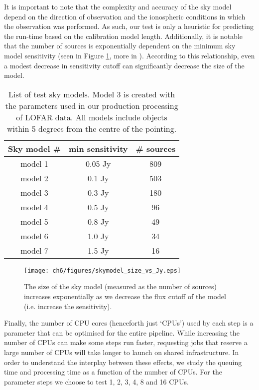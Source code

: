 It is important to note that the complexity and accuracy of the sky model depend on the direction of observation and the ionospheric conditions in which the observation was performed. As such, our test is only a heuristic for predicting the run-time based on the calibration model length. Additionally, it is notable that the number of sources is exponentially dependent on the minimum sky model sensitivity (seen in Figure \ref{fig:ch6_skymodel_size}, more in \citealt{tgssadr,Wendy_bootes}). According to this relationship, even a modest decrease in sensitivity cutoff can significantly decrease the size of the model.

\begin{table}[!ht]
\centering
\begin{tabular}{||c| c | c||} 
 \hline
 Sky model \# & min sensitivity & \# sources  \\ [0.5ex] 
 \hline
 model 1 & 0.05 Jy & 809    \\ 
 model 2 & 0.1 Jy & 503   \\
 \rowcolor{Gray}
  \hline
 model 3 & 0.3 Jy & 180   \\
  \hline
 model 4 & 0.5 Jy & 96  \\
 model 5 & 0.8 Jy & 49   \\ 
 model 6 & 1.0 Jy & 34   \\
 model 7 & 1.5 Jy & 16   \\[1ex] 
 \hline
\end{tabular}
    \caption[List of test sky models]{List of test sky models. Model 3 is created with the parameters used in our production processing of LOFAR data. All models include objects within 5 degrees from the centre of the pointing.  }
\label{table:skymodels}
\end{table}


\begin{figure}
    \texttt{[image: ch6/figures/skymodel\_size\_vs\_Jy.eps]}
      \caption{The size of the sky model (measured as the number of sources) increases exponentially as we decrease the flux cutoff of the model (i.e. increase the sensitivity).}
	\label{fig:ch6_skymodel_size}
\end{figure}


Finally, the number of CPU cores (henceforth just `CPUs') used by each step is a parameter that can be optimised for the entire pipeline. While increasing the number of CPUs can make some steps run faster, requesting jobs that reserve a large number of CPUs will take longer to launch on shared infrastructure. In order to understand the interplay between these effects, we study the queuing time and processing time as a function of the number of CPUs. For the parameter steps we choose to test 1, 2, 3, 4, 8 and 16 CPUs. 

